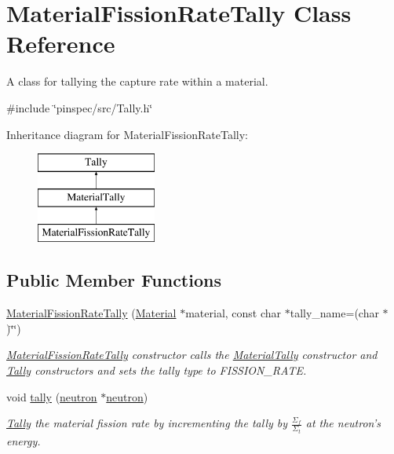 \hypertarget{classMaterialFissionRateTally}{\section{Material\-Fission\-Rate\-Tally Class Reference}
\label{classMaterialFissionRateTally}
}


A class for tallying the capture rate within a material.  




{\ttfamily \#include \char`\"{}pinspec/src/\-Tally.\-h\char`\"{}}

Inheritance diagram for Material\-Fission\-Rate\-Tally\-:\begin{figure}[H]
\begin{center}
\leavevmode
\includegraphics[height=3.000000cm]{classMaterialFissionRateTally}
\end{center}
\end{figure}
\subsection*{Public Member Functions}
\begin{DoxyCompactItemize}
\item 
\hyperlink{classMaterialFissionRateTally_a3ef088c0910245eab495e6921af55caa}{Material\-Fission\-Rate\-Tally} (\hyperlink{classMaterial}{Material} $\ast$material, const char $\ast$tally\-\_\-name=(char $\ast$)\char`\"{}\char`\"{})
\begin{DoxyCompactList}\small\item\em \hyperlink{classMaterialFissionRateTally}{Material\-Fission\-Rate\-Tally} constructor calls the \hyperlink{classMaterialTally}{Material\-Tally} constructor and \hyperlink{classTally}{Tally} constructors and sets the tally type to F\-I\-S\-S\-I\-O\-N\-\_\-\-R\-A\-T\-E. \end{DoxyCompactList}\item 
void \hyperlink{classMaterialFissionRateTally_aa47cb28d567ce9315872fff4251dce31}{tally} (\hyperlink{structneutron}{neutron} $\ast$\hyperlink{structneutron}{neutron})
\begin{DoxyCompactList}\small\item\em \hyperlink{classTally}{Tally} the material fission rate by incrementing the tally by $ \frac{\Sigma_f}{\Sigma_t} $ at the neutron's energy. \end{DoxyCompactList}\end{DoxyCompactItemize}
